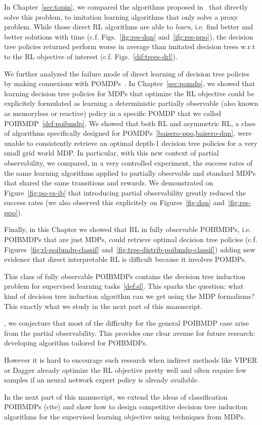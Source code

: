 In Chapter~\ref{sec:topin}, we compared the algorithms proposed in~\cite{topin2021iterative} that directly solve this problem, to imitation learning algorithms that only solve a proxy problem.
While those direct RL algorithms are able to \textit{learn}, i.e. find better and better solutions with time (c.f. Figs.~\ref{fig:res-dqn} and~\ref{ifg:res-ppo}), the decision tree policies returned perform worse in average than imitated decision trees w.r.t to the RL objective of interest (c.f. Figs.~\ref{dif:trees-drl}).

We further analyzed the failure mode of direct learning of decision tree policies by making connexions with POMDPs~\cite{POMDP,chap2}.
In Chapter~\ref{sec:pomdp}, we showed that learning decision tree policies for MDPs that optimize the RL objective could be explicitely formulated as learning a deterministic partially observable (also known as memoryless or reactive) policy in a specific POMDP that we called POIBMDP~\ref{def:poibmdp}.
We showed that both RL and asymmetric RL, a class of algorithms specifically designed for POMDPs~\ref{baisero-ppo,baisero-dqn}, were unable to consistently retrieve an optimal depth-1 decision tree policies for a very small grid world MDP.
In particular, with this new context of partial observability, we compared, in a very controlled experiment, the success rates of the same learning algorithms applied to partially observable and standard MDPs that shared the same transitions and rewards.
We demonstrated on Figure~\ref{fig:po-vs-ib} that introducing partial observability greatly reduced the success rates (we also observed this explicitely on Figures~\ref{fig:dqn} and~\ref{fig:res-ppo}).  

Finally, in this Chapter we showed that RL in fully observable POIBMDPs, i.e. POIBMDPs that are just MDPs, could retrieve optimal decision tree policies (c.f. Figures~\ref{fig:rl-poibmdp-classif} and~\ref{fig:tree-distrib-poibmdp-classif}) adding new evidence that direct interpretable RL is difficult because it involves POMDPs.

This class of fully observable POIBMDPs contains the decision tree induction problem for supervised learning tasks~\ref{def:sl}.
This sparks the question: what kind of decision tree induction algorithm can we get using the MDP formalisms?
This exactly what we study in the next part of this manuscript.


, we conjecture that most of the difficulty for the general POIBMDP case arise from the partial observability.
This provides one clear avenue for future research: developing algorithm tailored for POIBMDPs.

However it is hard to encourage such research when indirect methods like VIPER or Dagger already optimize the RL objective pretty well and often require few samples if an neural network expert policy is already available.

In the next part of this manuscript, we extend the ideas of classification POIBMDPs (cite) and show how to design competitive decision tree induciton algorithms for the supervised learning objective using techniques from MDPs.

